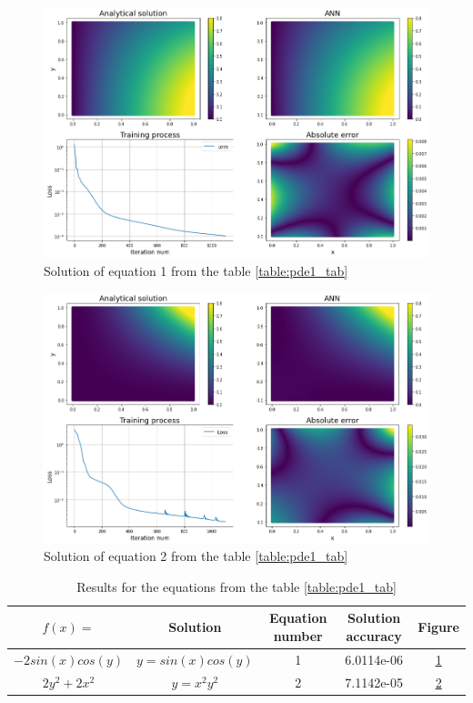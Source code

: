 \begin{figure}[h]
	\centering
	\includegraphics[width=\textwidth]{images/chapter2/pde_1_1.png}
	\caption{Solution of equation 1 from the table \ref{table:pde1_tab}}
	\label{fig:pde_1_1}
\end{figure}

\begin{figure}[h]
	\centering
	\includegraphics[width=\textwidth]{images/chapter2/pde_1_2.png}
	\caption{Solution of equation 2 from the table \ref{table:pde1_tab}}
	\label{fig:pde_1_2}
\end{figure}

\begin{table}[h]
	\centering
	\begin{tabular}{| c | c | c | c | c |} 
		\hline
		$f(x) = $ & Solution & Equation number & Solution accuracy & Figure \\ \hline
		$ -2 sin(x) cos(y) $ & $ y = sin(x) cos(y) $ & 1 & 6.0114e-06 & \ref{fig:pde_1_1} \\
		$ 2 y^2 + 2 x^2 $ & $ y = x^2 y^2 $ & 2 & 7.1142e-05 & \ref{fig:pde_1_2}  \\ \hline
	\end{tabular}
	\caption{Results for the equations from the table \ref{table:pde1_tab}}
	\label{table:pde1_tab_results}
\end{table}

